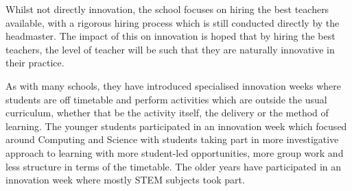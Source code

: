 Whilst not directly innovation, the school focuses on hiring the best teachers available, with a rigorous hiring process which is still conducted directly by the headmaster. The impact of this on innovation is hoped that by hiring the best teachers, the level of teacher will be such that they are naturally innovative in their practice.

As with many schools, they have introduced specialised innovation weeks where students are off timetable and perform activities which are outside the usual curriculum, whether that be the activity itself, the delivery or the method of learning. The younger students participated in an innovation week which focused around Computing and Science with students taking part in more investigative approach to learning with more student-led opportunities, more group work and less structure in terms of the timetable. The older years have participated in an innovation week where mostly STEM subjects took part.

